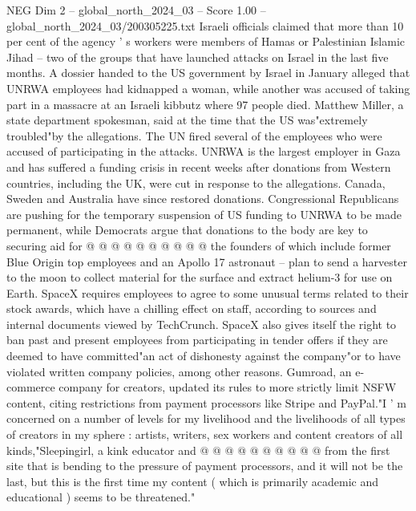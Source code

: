 \begin{textsample}{NEG Dim 2 – global\_north\_2024\_03 – Score 1.00 – global\_north\_2024\_03/200305225.txt}  \label{ex:f2_neg_341}
Israeli officials claimed that more than 10 per cent of the agency ' s workers were members of Hamas or Palestinian Islamic Jihad -- two of the groups that have launched attacks on Israel in the last five months.
A dossier handed to the US government by Israel in January alleged that UNRWA employees had kidnapped a woman, while another was accused of taking part in a massacre at an Israeli kibbutz where 97 people died.
Matthew Miller, a state department spokesman, said at the time that the US was"extremely troubled"by the allegations.
The UN fired several of the employees who were accused of participating in the attacks.
UNRWA is the largest employer in Gaza and has suffered a funding crisis in recent weeks after donations from Western countries, including the UK, were cut in response to the allegations.
Canada, Sweden and Australia have since restored donations.
Congressional Republicans are pushing for the temporary suspension of US funding to UNRWA to be made permanent, while Democrats argue that donations to the body are key to securing aid for @ @ @ @ @ @ @ @ @ @ the founders of which include former Blue Origin top employees and an Apollo 17 astronaut -- plan to send a harvester to the moon to collect material for the surface and extract helium-3 for use on Earth.
SpaceX requires employees to agree to some unusual terms related to their stock awards, which have a chilling effect on staff, according to sources and internal documents viewed by TechCrunch.
SpaceX also gives itself the right to ban past and present employees from participating in tender offers if they are deemed to have committed"an act of dishonesty against the company"or to have violated written company policies, among other reasons.
Gumroad, an e-commerce company for creators, updated its rules to more strictly limit NSFW content, citing restrictions from payment processors like Stripe and PayPal."I ' m concerned on a number of levels for my livelihood and the livelihoods of all types of creators in my sphere : artists, writers, sex workers and content creators of all kinds,"Sleepingirl, a kink educator and @ @ @ @ @ @ @ @ @ @ from the first site that is bending to the pressure of payment processors, and it will not be the last, but this is the first time my content ( which is primarily academic and educational ) seems to be threatened."

\end{textsample}
